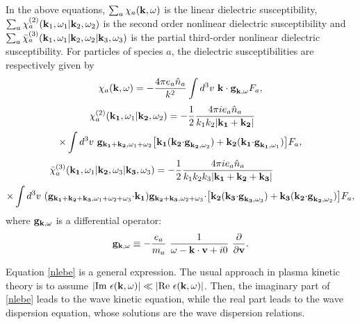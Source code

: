 \documentclass[12pt,a4paper,ruledheader]{report}
\begin{document}
In the above equations, $\sum_a \chi_a({\bf k},\omega)$
is the linear dielectric susceptibility,
$\sum_a \chi_a^{(2)}({\bf k}_1,\omega_1|{\bf k}_2,\omega_2)$ is the
second order nonlinear dielectric susceptibility and
$\sum_a \bar \chi_a^{(3)}({\bf k}_1,\omega_1|{\bf k}_2,\omega_2|{\bf k}_3,\omega_3)$
is the partial third-order nonlinear dielectric susceptibility.
For particles of species $a$, the dielectric susceptibilities
are respectively given by
\begin{equation}
\chi_a({\bf k},\omega)=-\frac{4\pi e_a\hat n_a}{k^2}
\int d^3v\ {\bf k \cdot g}_{{\bf k},\omega}F_a,
\end{equation}
\begin{equation}
\begin{split}
\chi_a^{(2)}({\bf k_1},\omega_1|{\bf k_2},\omega_2)
&=-\frac{1}{2}\frac{4\pi ie_a\hat n_a}{k_1k_2|{\bf k_1}+{\bf k_2}|}\\
\times\int d^3v\ {\bf g}_{{\bf k_1}+{\bf k_2}, \omega_1+\omega_2}
\bigl[{\bf k_1}&({\bf k_2}{\bf \cdot g}_{{\bf k_2},\omega_2})
 +{\bf k_2}({\bf k_1}{\bf \cdot g}_{{\bf k_1},\omega_1})\bigr]F_a,
\end{split}
\end{equation}
\begin{equation}
\begin{split}
  \bar \chi_a^{(3)}({\bf k_1},\omega_1|{\bf k_2},\omega_3|{\bf k_3},\omega_3)
  &=-\frac{1}{2}\frac{4\pi i e_a\hat n_a}{k_1k_2k_3|{\bf k_1}+{\bf k_2}+{\bf k_3}|}\\
  \times\int d^3v\
  ({\bf g}_{{\bf k_1}+{\bf k_2}+{\bf k_3}, \omega_1+\omega_2+\omega_3}{\bf \cdot k_1})
  {\bf g}&_{{\bf k_2}+{\bf k_3},\omega_2+\omega_3}{\bf \cdot}
  \bigl[{ \bf k_2}({\bf k_3}{\bf \cdot g}_{{\bf k_3},\omega_3})
  +{\bf k_3}({\bf k_2}{\bf \cdot g}_{{\bf k_2},\omega_2})\bigr]F_a,
\end{split}
\end{equation}
where ${\bf g}_{{\bf k},\omega}$ is a differential operator:
\begin{equation}
\label{op-dif}
  {\bf g}_{{\bf k},\omega}\equiv-\frac{e_a}{m_a}\
   \frac{1}{\omega-{\bf k \cdot v}+i0}\ \frac{\partial}{\partial \bf v}.
\end{equation}

Equation \eqref{nlebe} is a general expression. The usual
approach in plasma kinetic theory is to assume $|\mbox{Im}\
\epsilon({\bf k},\omega)|\ll|\mbox{Re}\ \epsilon({\bf k},\omega)|$.
Then, the imaginary part of \eqref{nlebe} leads to the wave kinetic
equation, while the real part leads to the wave dispersion equation,
whose solutions are the wave dispersion relations.
\end{document}
